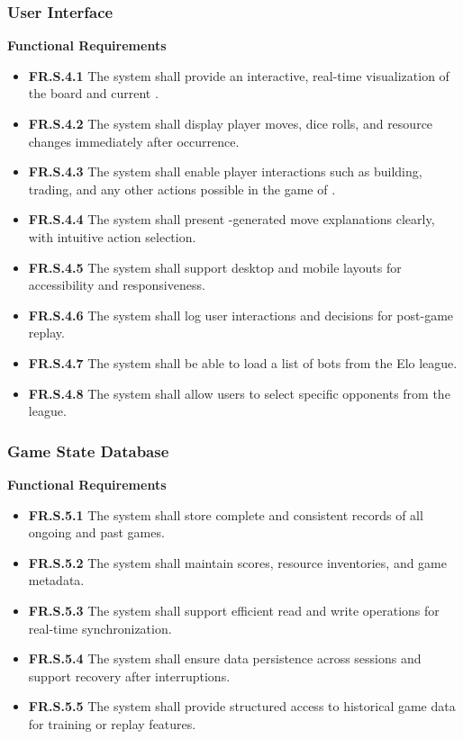 \documentclass{article}
\begin{document}
\subsubsection{User Interface}

\textbf{Functional Requirements}

\begin{itemize}
  \item \label{FR.S.4.1}\textbf{FR.S.4.1} The system shall provide an interactive, real-time visualization of the \emph{\Catan{}} board and current \GameState{}.
  \item \label{FR.S.4.2}\textbf{FR.S.4.2} The system shall display player moves, dice rolls, and resource changes immediately after occurrence.
  \item \label{FR.S.4.3}\textbf{FR.S.4.3} The system shall enable player interactions such as building, trading, and any other actions possible in the game of \emph{\Catan{}}.
  \item \label{FR.S.4.4}\textbf{FR.S.4.4} The system shall present \LLM{}-generated move explanations clearly, with intuitive action selection.
  \item \label{FR.S.4.5}\textbf{FR.S.4.5} The system shall support desktop and mobile layouts for accessibility and responsiveness.
  \item \label{FR.S.4.6}\textbf{FR.S.4.6} The system shall log user interactions and decisions for post-game replay.
  \item \label{FR.S.4.7}\textbf{FR.S.4.7} The system shall be able to load a list of bots from the Elo league.
  \item \label{FR.S.4.8}\textbf{FR.S.4.8} The system shall allow users to select specific opponents from the league.
\end{itemize}


\subsubsection{Game State Database}

\textbf{Functional Requirements}

\begin{itemize}
  \item \label{FR.S.5.1}\textbf{FR.S.5.1} The system shall store complete and consistent records of all ongoing and past \emph{\Catan{}} games.
  \item \label{FR.S.5.2}\textbf{FR.S.5.2} The system shall maintain scores, resource inventories, and game metadata.
  \item \label{FR.S.5.3}\textbf{FR.S.5.3} The system shall support efficient read and write operations for real-time synchronization.
  \item \label{FR.S.5.4}\textbf{FR.S.5.4} The system shall ensure data persistence across sessions and support recovery after interruptions.
  \item \label{FR.S.5.5}\textbf{FR.S.5.5} The system shall provide structured access to historical game data for training or replay features.
\end{itemize}
\end{document}
